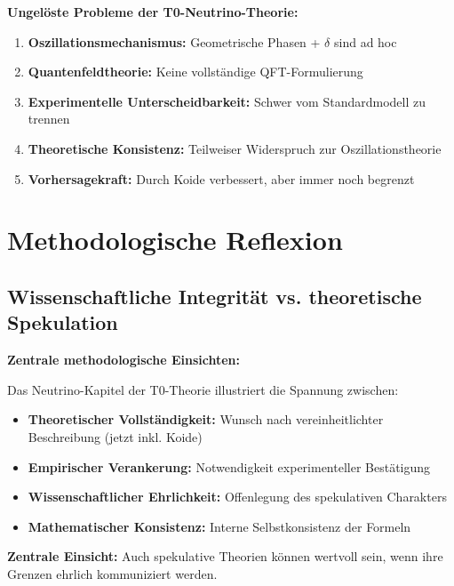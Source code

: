 	\begin{warning}
		\textbf{Ungelöste Probleme der T0-Neutrino-Theorie:}
		
		\begin{enumerate}
			\item \textbf{Oszillationsmechanismus:} Geometrische Phasen + $\delta$ sind ad hoc
			\item \textbf{Quantenfeldtheorie:} Keine vollständige QFT-Formulierung
			\item \textbf{Experimentelle Unterscheidbarkeit:} Schwer vom Standardmodell zu trennen
			\item \textbf{Theoretische Konsistenz:} Teilweiser Widerspruch zur Oszillationstheorie
			\item \textbf{Vorhersagekraft:} Durch Koide verbessert, aber immer noch begrenzt
		\end{enumerate}
	\end{warning}
	
	\section{Methodologische Reflexion}
	
	\subsection{Wissenschaftliche Integrität vs. theoretische Spekulation}
	
	\begin{keyresult}
		\textbf{Zentrale methodologische Einsichten:}
		
		Das Neutrino-Kapitel der T0-Theorie illustriert die Spannung zwischen:
		
		\begin{itemize}
			\item \textbf{Theoretischer Vollständigkeit:} Wunsch nach vereinheitlichter Beschreibung (jetzt inkl. Koide)
			\item \textbf{Empirischer Verankerung:} Notwendigkeit experimenteller Bestätigung
			\item \textbf{Wissenschaftlicher Ehrlichkeit:} Offenlegung des spekulativen Charakters
			\item \textbf{Mathematischer Konsistenz:} Interne Selbstkonsistenz der Formeln
		\end{itemize}
		
		\textbf{Zentrale Einsicht:} Auch spekulative Theorien können wertvoll sein, wenn ihre Grenzen ehrlich kommuniziert werden.
	\end{keyresult}
	
